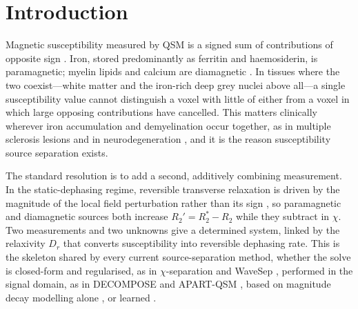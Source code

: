 \documentclass[AMA,STIX2COL,Linenumberson]{MRM}
\begin{document}

\maketitle


\section{Introduction}

Magnetic susceptibility measured by QSM is a signed sum of contributions of opposite sign \cite{schweser_foundations_2016,haacke_quantitative_2015}. Iron, stored predominantly as ferritin and haemosiderin, is paramagnetic; myelin lipids and calcium are diamagnetic \cite{duyn_contributions_2017,liu_susceptibilityweighted_2015}. In tissues where the two coexist---white matter and the iron-rich deep grey nuclei above all---a single susceptibility value cannot distinguish a voxel with little of either from a voxel in which large opposing contributions have cancelled. This matters clinically wherever iron accumulation and demyelination occur together, as in multiple sclerosis lesions \cite{kiersnowski_investigating_2023} and in neurodegeneration \cite{langkammer_quantitative_2018,wisnieff_quantitative_2015}, and it is the reason susceptibility source separation exists.

The standard resolution is to add a second, additively combining measurement. In the static-dephasing regime, reversible transverse relaxation is driven by the magnitude of the local field perturbation rather than its sign \cite{yablonskiy_theory_1994}, so paramagnetic and diamagnetic sources both increase $R_2' = R_2^{*} - R_2$ while they subtract in $\chi$. Two measurements and two unknowns give a determined system, linked by the relaxivity $D_r$ that converts susceptibility into reversible dephasing rate. This is the skeleton shared by every current source-separation method, whether the solve is closed-form and regularised, as in $\chi$-separation \cite{shin_chiseparation_2021} and WaveSep \cite{fang_wavesep_2023}, performed in the signal domain, as in DECOMPOSE \cite{chen_decompose_2021} and APART-QSM \cite{apartqsm_TODO}, based on magnitude decay modelling alone \cite{dimov_r2star_2022}, or learned \cite{kim_chisepnet_2025,susepnet_TODO}.
\end{document}
